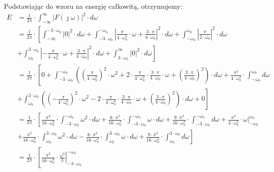 \begin{task}
Podstawiając do wzoru na energię całkowitą, otrzymujemy:
\begin{align*}
E &= \frac{1}{2\pi} \cdot \int_{-\infty}^{\infty} \left|F(\jmath \omega)\right|^2 \cdot d\omega\\
&= \frac{1}{2\pi} \cdot \left[\int_{-\infty}^{-3 \cdot \omega_0} \left|0\right|^2 \cdot d\omega + \int_{-3 \cdot \omega_0}^{-\omega_0} \left|\frac{\pi}{4 \cdot \omega_0^2} \cdot \omega + \frac{3 \cdot \pi}{4 \cdot \omega_0}\right|^2 \cdot d\omega + \int_{-\omega_0}^{\omega_0} \left|\frac{\pi}{2 \cdot \omega_0}\right|^2 \cdot d\omega\right.\\
&\left.+\int_{\omega_0}^{3 \cdot \omega_0} \left|-\frac{\pi}{4 \cdot \omega_0^2} \cdot \omega + \frac{3 \cdot \pi}{4 \cdot \omega_0}\right|^2 \cdot d\omega + \int_{3 \cdot \omega_0}^{\infty} \left|0\right|^2 \cdot d\omega \right]\\
&= \frac{1}{2\pi} \cdot \left[0 + \int_{-3 \cdot \omega_0}^{-\omega_0} \left(\left(\frac{\pi}{4 \cdot \omega_0^2}\right)^2 \cdot \omega^2 + 2 \cdot \frac{\pi}{4 \cdot \omega_0^2} \cdot \frac{3 \cdot \pi}{4 \cdot \omega_0} \cdot \omega + \left(\frac{3 \cdot \pi}{4 \cdot \omega_0}\right)^2\right) \cdot d\omega + \frac{\pi^2}{4 \cdot \omega_0^2}\cdot \int_{-\omega_0}^{\omega_0} d\omega\right.\\
&\left.+ \int_{\omega_0}^{3 \cdot \omega_0} \left(\left(-\frac{\pi}{4 \cdot \omega_0^2}\right)^2 \cdot \omega^2 - 2 \cdot \frac{\pi}{4 \cdot \omega_0^2} \cdot \frac{3 \cdot \pi}{4 \cdot \omega_0} \cdot \omega + \left(\frac{3 \cdot \pi}{4 \cdot \omega_0}\right)^2\right) \cdot d\omega + 0 \right]\\
&= \frac{1}{2\pi} \cdot \left[\frac{\pi^2}{16 \cdot \omega_0^4} \cdot \int_{-3 \cdot \omega_0}^{-\omega_0} \omega^2 \cdot d\omega + \frac{6 \cdot \pi^2}{16 \cdot \omega_0^3} \cdot \int_{-3 \cdot \omega_0}^{-\omega_0} \omega \cdot d\omega + \frac{9 \cdot \pi^2}{16 \cdot \omega_0^2} \cdot \int_{-3 \cdot \omega_0}^{-\omega_0} d\omega + \frac{\pi^2}{4 \cdot \omega_0^2}\cdot \left. \omega\right|_{-\omega_0}^{\omega_0}\right.\\
&\left.+ \frac{\pi^2}{16 \cdot \omega_0^4} \cdot \int_{\omega_0}^{3 \cdot \omega_0} \omega^2 \cdot d\omega - \frac{6 \cdot \pi^2}{16 \cdot \omega_0^3} \cdot \int_{\omega_0}^{3 \cdot \omega_0} \omega \cdot d\omega + \frac{9 \cdot \pi^2}{16 \cdot \omega_0^2} \cdot \int_{\omega_0}^{3 \cdot \omega_0} d\omega \right]\\
&= \frac{1}{2\pi} \cdot \left[\frac{\pi^2}{16 \cdot \omega_0^4} \cdot \left.\frac{\omega^3}{3}\right|_{-3 \cdot \omega_0}^{-\omega_0} 

\end{align*}
\end{task}
